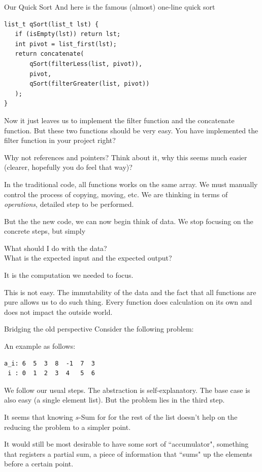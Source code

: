 \begin{frame}[fragile]{Our Quick Sort}
And here is the famous (almost) one-line quick sort
\begin{verbatim}
list_t qSort(list_t lst) {
   if (isEmpty(lst)) return lst;
   int pivot = list_first(lst);
   return concatenate(
       qSort(filterLess(list, pivot)),
       pivot,
       qSort(filterGreater(list, pivot))
   );
}
\end{verbatim}
Now it just leaves us to implement the filter function and the concatenate function. But these two functions should be very easy. You have implemented the filter function in your project right? 
\end{frame}

\begin{frame}{Why not references and pointers?}
Think about it, why this seems much easier (clearer, hopefully you do feel that way)? 

In the traditional code, all functions works on the same array. We must manually control the process of copying, moving, etc. We are thinking in terms of \textit{operations}, detailed step to be performed.

But the the new code, we can now begin think of data. We stop focusing on the concrete steps, but simply
\begin{center}
	What should I do with the data? \\What is the expected input and the expected output?
\end{center} 
It is the computation we needed to focus. 

This is not easy. The immutability of the data and the fact that all functions are pure allows us to do such thing. Every function does calculation on its own and does not impact the outside world.
\end{frame}

\begin{frame}[fragile]{Bridging the old perspective}
Consider the following problem:

\vspace{0.1in}
\vspace{0.1in}

An example as follows:

\begin{verbatim}
a_i: 6  5  3  8  -1  7  3 
 i : 0  1  2  3  4   5  6
\end{verbatim}

We follow our usual steps. The abstraction is self-explanatory. The base case is also easy (a single element list). But the problem lies in the third step. 

It seems that knowing $s$-Sum for for the rest of the list doesn't help on the reducing the problem to a simpler point. 

It would still be most desirable to have some sort of ``accumulator", something that registers a partial sum, a piece of information that ``sums" up the elements before a certain point.
\end{frame}

